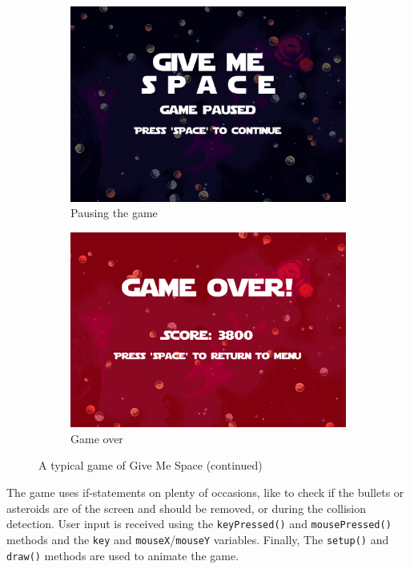 \begin{figure}[H]
    \ContinuedFloat
    \centering
    \begin{subfigure}[b]{0.45\textwidth}
        \centering
        \includegraphics[width=\textwidth]{Figures/day_3/paused.png}
        \caption{Pausing the game}
        \label{fig: space paused game}
    \end{subfigure}
    \hspace{1cm}
    \begin{subfigure}[b]{0.45\textwidth}
        \centering
        \includegraphics[width=\textwidth]{Figures/day_3/game_over.png}
        \caption{Game over}
        \label{fig: space game over}
    \end{subfigure}

    \caption{A typical game of Give Me Space (continued)}

\end{figure}

The game uses if-statements on plenty of occasions, like to check if the bullets or asteroids are of the screen and should be removed, or during the collision detection. User input is received using the \texttt{keyPressed()} and \texttt{mousePressed()} methods and the \texttt{key} and \texttt{mouseX}/\texttt{mouseY} variables. Finally, The \texttt{setup()} and \texttt{draw()} methods are used to animate the game.